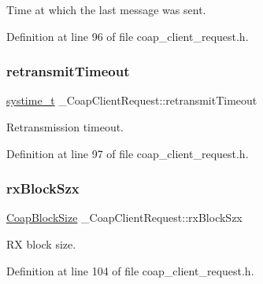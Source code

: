 Time at which the last message was sent. 



Definition at line 96 of file coap\+\_\+client\+\_\+request.\+h.

\mbox{\label{struct__CoapClientRequest_a7419bf61bbf904c2c6270c432fdfe95f}} 
\subsubsection{\texorpdfstring{retransmit\+Timeout}{retransmitTimeout}}
{\footnotesize\ttfamily \hyperlink{compiler__port_8h_ae3e32a98d431a02106616da3071832dd}{systime\+\_\+t} \+\_\+\+Coap\+Client\+Request\+::retransmit\+Timeout}



Retransmission timeout. 



Definition at line 97 of file coap\+\_\+client\+\_\+request.\+h.

\mbox{\label{struct__CoapClientRequest_aaa922cd85a12bc48e3b2c5a2aca54342}} 
\subsubsection{\texorpdfstring{rx\+Block\+Szx}{rxBlockSzx}}
{\footnotesize\ttfamily \hyperlink{coap__option_8h_ad1e9eed649f4a72e0e2219dae49cbae8}{Coap\+Block\+Size} \+\_\+\+Coap\+Client\+Request\+::rx\+Block\+Szx}



RX block size. 



Definition at line 104 of file coap\+\_\+client\+\_\+request.\+h.

\mbox{\label{struct__CoapClientRequest_a183ffb53f21e7acfe53c166e43540c50}} 
